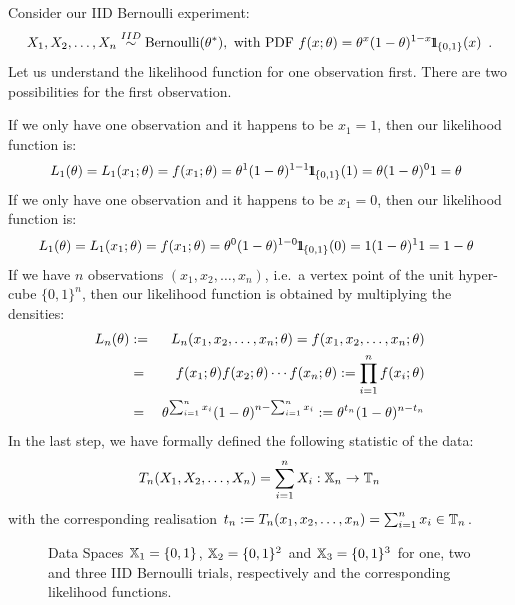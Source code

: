 \begin{example}
Consider our IID Bernoulli experiment:
$$
X_1,X_2,\ldots,X_n \overset{IID}{\sim} \mbox{{\rm Bernoulli}}(\theta^*), \text{ with PDF } f(x;\theta)=\theta^x(1-\theta)^{1-x} {1}\mspace{-11 mu}{1}_{\{0,1\}}(x) \enspace .
$$
Let us understand the likelihood function for one observation first.  There are two possibilities for the first observation.  

If we only have one observation and it happens to be $x_1=1$, then our likelihood function is:
$$L_1(\theta)=L_1(x_1;\theta)
= f(x_1;\theta)
=\theta^{1}(1-\theta)^{1-1} {1}\mspace{-11 mu}{1}_{\{0,1\}}(1)
=\theta (1-\theta)^0 1
=\theta \enspace
$$
If we only have one observation and it happens to be $x_1=0$, then our likelihood function is:
$$L_1(\theta)=L_1(x_1;\theta)
= f(x_1;\theta)
=\theta^{0}(1-\theta)^{1-0} {1}\mspace{-11 mu}{1}_{\{0,1\}}(0)
=1 (1-\theta)^1 1
=1-\theta \enspace
$$
If we have $n$ observations $(x_1,x_2,\ldots,x_n)$, i.e.~a vertex point of the unit hyper-cube $\{0,1\}^n$, then our likelihood function is obtained by multiplying the densities:
\begin{eqnarray}
L_n(\theta) &:=& L_n(x_1,x_2,\ldots,x_n; \theta)  = f(x_1,x_2,\ldots,x_n ; \theta) \notag \\
&=& f(x_1 ; \theta) f(x_2 ; \theta) \cdots f(x_n ; \theta) := \prod_{i=1}^n f(x_i ; \theta) \notag \\
&=& \theta^{\sum_{i=1}^n x_i} (1-\theta)^ {n-\sum_{i=1}^n x_i} := \theta^{t_n} (1-\theta)^{n-t_n} \notag 
\end{eqnarray}
In the last step, we have formally defined the following statistic of the data: 
$$T_n(X_1,X_2,\ldots,X_n)=\sum_{i=1}^n X_i :  \mathbb{X}_n \rightarrow \mathbb{T}_n$$ with the corresponding realisation $t_n := T_n(x_1,x_2,\ldots,x_n)=\sum_{i=1}^n x_i \in \mathbb{T}_n$. 
\end{example}

\begin{figure}[ht]
\caption{Data Spaces $\mathbb{X}_1=\{0,1\}$, $\mathbb{X}_2=\{0,1\}^2$ and $\mathbb{X}_3=\{0,1\}^3$ for one, two and three IID Bernoulli trials, respectively and the corresponding likelihood functions.\label{F:BernoulliSampleLkl}}
\centering   {}
\end{figure}

